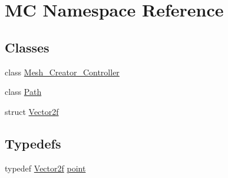 \hypertarget{namespace_m_c}{}\section{MC Namespace Reference}
\label{namespace_m_c}
\subsection*{Classes}
\begin{DoxyCompactItemize}
\item 
class \mbox{\hyperlink{class_m_c_1_1_mesh___creator___controller}{Mesh\+\_\+\+Creator\+\_\+\+Controller}}
\item 
class \mbox{\hyperlink{class_m_c_1_1_path}{Path}}
\item 
struct \mbox{\hyperlink{struct_m_c_1_1_vector2f}{Vector2f}}
\end{DoxyCompactItemize}
\subsection*{Typedefs}
\begin{DoxyCompactItemize}
\item 
typedef \mbox{\hyperlink{struct_m_c_1_1_vector2f}{Vector2f}} \mbox{\hyperlink{namespace_m_c_ae49fc0a0f3e78b01be72793719d33214}{point}}
\end{DoxyCompactItemize}
